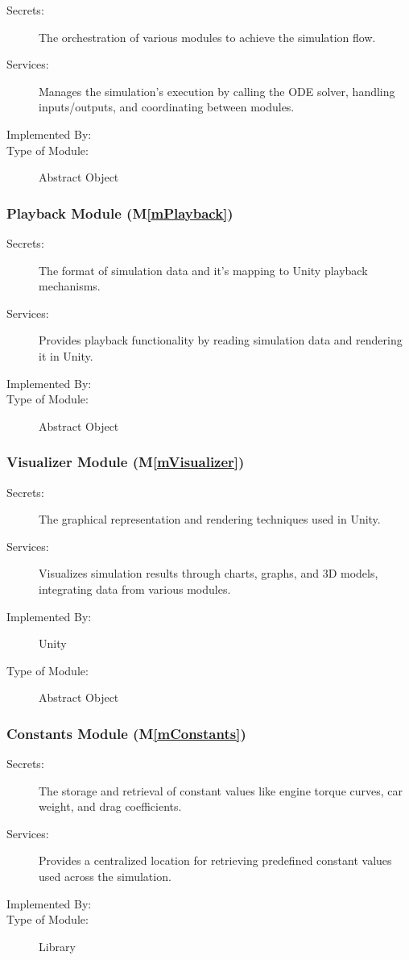 \documentclass[12pt, titlepage]{article}
\newcommand{\mref}[1]{M\ref{#1}}
\begin{document}
\begin{description}
\item[Secrets:] The orchestration of various modules to achieve the simulation flow.
\item[Services:] Manages the simulation's execution by calling the ODE solver, handling inputs/outputs, and coordinating between modules.
\item[Implemented By:] \progname{}
\item[Type of Module:] Abstract Object
\end{description}

\subsubsection{Playback Module (\mref{mPlayback})}

\begin{description}
\item[Secrets:] The format of simulation data and it's mapping to Unity playback mechanisms.
\item[Services:] Provides playback functionality by reading simulation data and rendering it in Unity.
\item[Implemented By:] \progname{}
\item[Type of Module:] Abstract Object
\end{description}

\subsubsection{Visualizer Module (\mref{mVisualizer})}

\begin{description}
\item[Secrets:] The graphical representation and rendering techniques used in Unity.
\item[Services:] Visualizes simulation results through charts, graphs, and 3D models, integrating data from various modules.
\item[Implemented By:] Unity
\item[Type of Module:] Abstract Object
\end{description}

\subsubsection{Constants Module (\mref{mConstants})}

\begin{description}
\item[Secrets:] The storage and retrieval of constant values like engine torque curves, car weight, and drag coefficients.
\item[Services:] Provides a centralized location for retrieving predefined constant values used across the simulation.
\item[Implemented By:] \progname{}
\item[Type of Module:] Library
\end{description}
\end{document}
